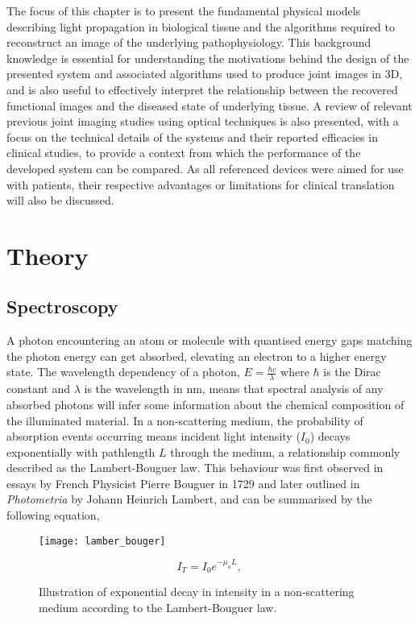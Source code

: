 \documentclass[twoside]{bhamthesis}
\theoremstyle{definition}
\begin{document}
The focus of this chapter is to present the fundamental physical models describing light propagation in biological tissue and the algorithms required to reconstruct an image of the underlying pathophysiology. This background knowledge is essential for understanding the motivations behind the design of the presented system and associated algorithms used to produce joint images in 3D, and is also useful to effectively interpret the relationship between the recovered functional images and the diseased state of underlying tissue. A review of relevant previous joint imaging studies using optical techniques is also presented, with a focus on the technical details of the systems and their reported efficacies in clinical studies, to provide a context from which the performance of the developed system can be compared. As all referenced devices were aimed for use with patients, their respective advantages or limitations for clinical translation will also be discussed.

\section{Theory}

\subsection{Spectroscopy}

A photon encountering an atom or molecule with quantised energy gaps matching the photon energy can get absorbed, elevating an electron to a higher energy state. The wavelength dependency of a photon, $E = \frac{\hbar c}{\lambda}$ where $\hbar$ is the Dirac constant and $\lambda$ is the wavelength in nm, means that spectral analysis of any absorbed photons will infer some information about the chemical composition of the illuminated material. In a non-scattering medium, the probability of absorption events occurring means incident light intensity ($I_0$) decays exponentially with pathlength $L$ through the medium, a relationship commonly described as the Lambert-Bouguer law. This behaviour was first observed in essays by French Physicist Pierre Bouguer in 1729 and later outlined in \textit{Photometria} by Johann Heinrich Lambert, and can be summarised by the following equation,

\begin{figure}[!ht]
	\begin{minipage}{.7\textwidth}
    \centering
    \texttt{[image: lamber\_bouger]}
    \caption{Illustration of exponential decay in intensity in a non-scattering medium according to the Lambert-Bouguer law.}  
  \end{minipage}%
  \begin{minipage}{.3\textwidth}
     \begin{equation}
	I_T = I_0 e ^{-\mu _a L},
  	\label{eqn:Lambert-Bouger}
    \end{equation}
  \end{minipage}
\end{figure}
\end{document}
